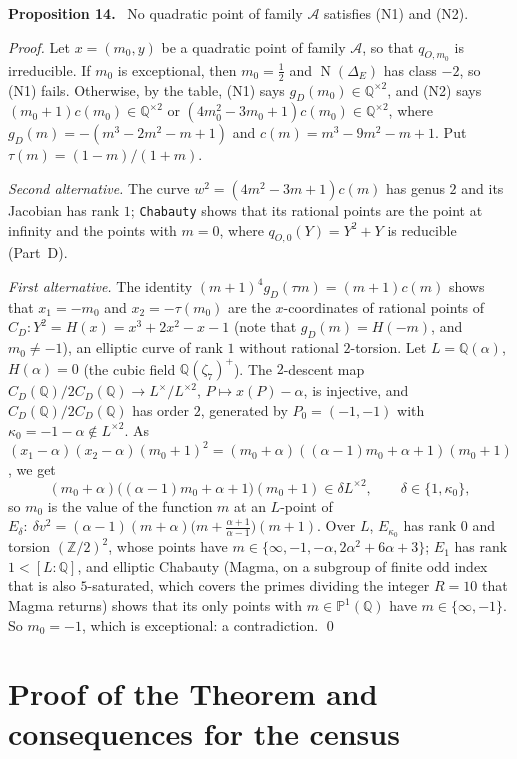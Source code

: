 \documentclass[11pt]{article}
\newenvironment{statement}[1]{\par\medskip\noindent\phantomsection\textbf{#1}\ }{\par\medskip}
\newcommand{\Q}{\mathbb Q}
\newcommand{\Z}{\mathbb Z}
\DeclareMathOperator{\Norm}{N}
\begin{document}
\begin{statement}{Proposition 14.}\label{prop-A}
No quadratic point of family \(\mathcal A\) satisfies (N1) and (N2).
\end{statement}

\emph{Proof.} Let \(x=(m_0,y)\) be a quadratic point of family \(\mathcal A\), so that \(q_{O,m_0}\) is irreducible.
If \(m_0\) is exceptional, then \(m_0=\frac12\) and \(\Norm(\Delta_E)\) has class \(-2\), so (N1) fails. Otherwise,
by the table, (N1) says \(g_D(m_0)\in\Q^{\times2}\), and (N2) says \((m_0+1)c(m_0)\in\Q^{\times2}\) or
\((4m_0^2-3m_0+1)c(m_0)\in\Q^{\times2}\), where \(g_D(m)=-(m^3-2m^2-m+1)\) and \(c(m)=m^3-9m^2-m+1\). Put
\(\tau(m)=(1-m)/(1+m)\).

\emph{Second alternative.} The curve \(w^2=(4m^2-3m+1)c(m)\) has genus \(2\) and its Jacobian has rank \(1\);
\texttt{Chabauty} shows that its rational points are the point at infinity and the points with \(m=0\), where
\(q_{O,0}(Y)=Y^2+Y\) is reducible (Part~D).

\emph{First alternative.} The identity \((m+1)^4g_D(\tau m)=(m+1)c(m)\) shows that \(x_1=-m_0\) and
\(x_2=-\tau(m_0)\) are the \(x\)-coordinates of rational points of \(C_D:Y^2=H(x)=x^3+2x^2-x-1\) (note that
\(g_D(m)=H(-m)\), and \(m_0\ne-1\)), an elliptic curve of rank \(1\) without rational \(2\)-torsion. Let
\(L=\Q(\alpha)\), \(H(\alpha)=0\) (the cubic field \(\Q(\zeta_7)^+\)). The \(2\)-descent map
\(C_D(\Q)/2C_D(\Q)\to L^\times/L^{\times2}\), \(P\mapsto x(P)-\alpha\), is injective, and \(C_D(\Q)/2C_D(\Q)\) has
order \(2\), generated by \(P_0=(-1,-1)\) with \(\kappa_0=-1-\alpha\notin L^{\times2}\). As
\((x_1-\alpha)(x_2-\alpha)(m_0+1)^2=(m_0+\alpha)((\alpha-1)m_0+\alpha+1)(m_0+1)\), we get
\[(m_0+\alpha)\bigl((\alpha-1)m_0+\alpha+1\bigr)(m_0+1)\in\delta L^{\times2},\qquad\delta\in\{1,\kappa_0\},\]
so \(m_0\) is the value of the function \(m\) at an \(L\)-point of
\(E_\delta:\ \delta v^2=(\alpha-1)(m+\alpha)\bigl(m+\tfrac{\alpha+1}{\alpha-1}\bigr)(m+1)\). Over \(L\),
\(E_{\kappa_0}\) has rank \(0\) and torsion \((\Z/2)^2\), whose points have
\(m\in\{\infty,-1,-\alpha,2\alpha^2+6\alpha+3\}\); \(E_1\) has rank \(1<[L:\Q]\), and elliptic Chabauty \cite{Br}
(Magma, on a subgroup of finite odd index that is also \(5\)-saturated, which covers the primes dividing the integer
\(R=10\) that Magma returns) shows that its only points with \(m\in\mathbb P^1(\Q)\) have \(m\in\{\infty,-1\}\). So
\(m_0=-1\), which is exceptional: a contradiction. \qed

\section{Proof of the Theorem and consequences for the census}\label{proof}
\end{document}
